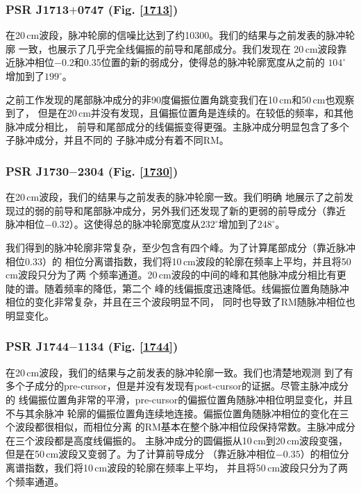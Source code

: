 \subsubsection{PSR J1713$+$0747 (Fig. \ref{1713})}

在20\,cm波段，脉冲轮廓的信噪比达到了约10300。我们的结果与之前发表的脉冲轮廓
一致\supercite{Ord04,Yan11a}，也展示了几乎完全线偏振的前导和尾部成分。我们发现在
20\,cm波段靠近脉冲相位$-0.2$和0.35位置的新的弱成分，使得总的脉冲轮廓宽度从之前的
$104^{\circ}$增加到了$199^{\circ}$。

之前工作发现的尾部脉冲成分的非90度偏振位置角跳变我们在10\,cm和50\,cm也观察到了，
但是在20\,cm并没有发现，且偏振位置角是连续的。在较低的频率，和其他脉冲成分相比，
前导和尾部成分的线偏振变得更强。主脉冲成分明显包含了多个子脉冲成分，并且不同的
子脉冲成分有着不同RM。

\subsubsection{PSR J1730$-$2304 (Fig. \ref{1730})}

在20\,cm波段，我们的结果与之前发表的脉冲轮廓一致\supercite{Ord04,Yan11a}。我们明确
地展示了之前发现过的弱的前导和尾部脉冲成分，另外我们还发现了新的更弱的前导成分（靠近
脉冲相位$-0.32$）。这使得总的脉冲轮廓宽度从$232^{\circ}$增加到了$248^{\circ}$。

我们得到的脉冲轮廓非常复杂，至少包含有四个峰。为了计算尾部成分（靠近脉冲相位0.33）的
相位分离谱指数，我们将10\,cm波段的轮廓在频率上平均，并且将50\,cm波段只分为了两
个频率通道。20\,cm波段的中间的峰和其他脉冲成分相比有更陡的谱。随着频率的降低，第二个
峰的线偏振度迅速降低。线偏振位置角随脉冲相位的变化非常复杂，并且在三个波段明显不同，
同时也导致了RM随脉冲相位也明显变化。

\subsubsection{PSR J1744$-$1134 (Fig. \ref{1744})}

在20\,cm波段，我们的结果与之前发表的脉冲轮廓一致\supercite{Yan11a}。我们也清楚地观测
到了有多个子成分的pre-cursor，但是并没有发现有post-cursor的证据。尽管主脉冲成分的
线偏振位置角非常的平滑，pre-cursor的偏振位置角随脉冲相位明显变化，并且不与其余脉冲
轮廓的偏振位置角连续地连接。偏振位置角随脉冲相位的变化在三个波段都很相似，而相位分离
的RM基本在整个脉冲相位段保持常数。主脉冲成分在三个波段都是高度线偏振的。
主脉冲成分的圆偏振从10\,cm到20\,cm波段变强，但是在50\,cm波段又变弱了。为了计算前导成分
（靠近脉冲相位$-0.35$）的相位分离谱指数，我们将10\,cm波段的轮廓在频率上平均，
并且将50\,cm波段只分为了两个频率通道。

